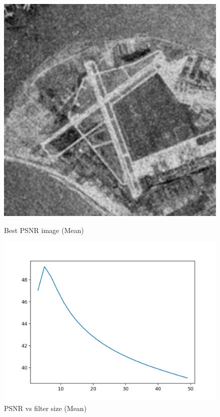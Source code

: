 \documentclass{article}
\begin{document}
    \begin{figure}[!htb]
      \includegraphics[scale=0.3]{./basic_denoising/sandiego/average_best_sp.png}
      \caption{Best PSNR image (Mean)}
    \endminipage \hfill
      \includegraphics[scale=.45]{./basic_denoising/sandiego/average_psnr_sp.png}
      \caption{PSNR vs filter size (Mean)}
    \endminipage
    \end{figure}
    
\end{document}

